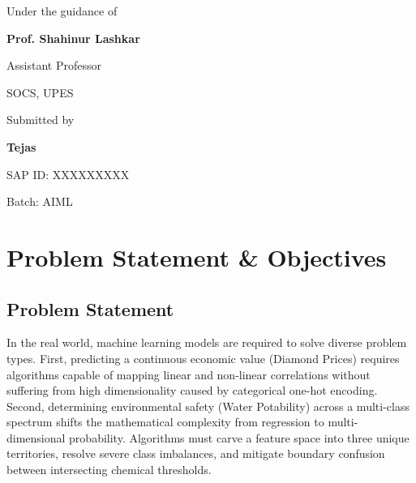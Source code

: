 \documentclass[12pt, a4paper]{article}
\begin{document}
\begin{titlepage}
    \begin{minipage}[t]{0.45\textwidth}
        \begin{flushleft}
            {\normalsize Under the guidance of\par}
            \vspace{0.4cm}
            {\large \textbf{\textcolor{primaryblue}{Prof. Shahinur Lashkar}} \par}
            {\normalsize Assistant Professor \par}
            {\normalsize SOCS, UPES \par}
        \end{flushleft}
    \end{minipage}
    \hfill
    \begin{minipage}[t]{0.45\textwidth}
        \begin{flushright}
            {\normalsize Submitted by \par}
            \vspace{0.4cm}
            {\large \textbf{\textcolor{primaryblue}{Tejas}} \par}
            {\normalsize SAP ID: XXXXXXXXX \par}
            {\normalsize Batch: AIML \par}
        \end{flushright}
    \end{minipage}
    
    \vspace{1cm}
    
\end{titlepage}

\newpage
\tableofcontents
\newpage

\section{Problem Statement \& Objectives}

\subsection{Problem Statement}
In the real world, machine learning models are required to solve diverse problem types. 
First, predicting a continuous economic value (Diamond Prices) requires algorithms capable of mapping linear and non-linear correlations without suffering from high dimensionality caused by categorical one-hot encoding.
Second, determining environmental safety (Water Potability) across a multi-class spectrum shifts the mathematical complexity from regression to multi-dimensional probability. Algorithms must carve a feature space into three unique territories, resolve severe class imbalances, and mitigate boundary confusion between intersecting chemical thresholds.
\end{document}
